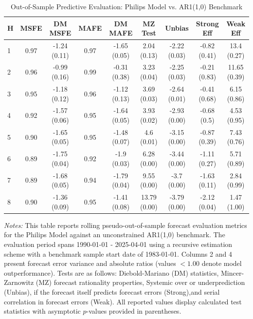 \begin{table}[htbp]
\centering
\caption{Out-of-Sample Predictive Evaluation: Philips Model vs. AR1(1,0) Benchmark}
\label{tab:philips_model_evaluation}
\footnotesize
\begin{tabular}{l cccccccc}
\hline\hline
\rule{0pt}{3ex}
\textbf{H} & \textbf{MSFE} & \textbf{DM MSFE} & \textbf{MAFE} & \textbf{DM MAFE} & \textbf{MZ Test} & \textbf{Unbias} & \textbf{Strong Eff} & \textbf{Weak Eff} \\[0.5ex]
\hline
\rule{0pt}{2.5ex}
1 & 0.97 & -1.24 (0.11) & 0.97 & -1.65 (0.05) & 2.04 (0.13) & -2.22 (0.03) & -0.82 (0.41) & 13.4 (0.27) \\
2 & 0.96 & -0.99 (0.16) & 0.99 & -0.31 (0.38) & 3.23 (0.04) & -2.25 (0.03) & -0.21 (0.83) & 11.65 (0.39) \\
3 & 0.95 & -1.18 (0.12) & 0.96 & -1.12 (0.13) & 3.69 (0.03) & -2.64 (0.01) & -0.41 (0.68) & 6.15 (0.86) \\
4 & 0.92 & -1.57 (0.06) & 0.95 & -1.64 (0.05) & 3.93 (0.02) & -2.93 (0.00) & -0.68 (0.5) & 4.53 (0.95) \\
5 & 0.90 & -1.65 (0.05) & 0.95 & -1.48 (0.07) & 4.6 (0.01) & -3.15 (0.00) & -0.87 (0.39) & 7.43 (0.76) \\
6 & 0.89 & -1.75 (0.04) & 0.92 & -1.9 (0.03) & 6.28 (0.00) & -3.44 (0.00) & -1.11 (0.27) & 5.71 (0.89) \\
7 & 0.89 & -1.68 (0.05) & 0.94 & -1.79 (0.04) & 9.55 (0.00) & -3.7 (0.00) & -1.63 (0.11) & 2.84 (0.99) \\
8 & 0.90 & -1.36 (0.09) & 0.95 & -1.41 (0.08) & 13.79 (0.00) & -3.79 (0.00) & -2.12 (0.04) & 1.47 (1.00) \\
\hline\hline
\end{tabular}%
\par\smallskip
\parbox{\textwidth}{\scriptsize \textit{Notes:} This table reports rolling pseudo-out-of-sample forecast evaluation metrics for the Philips Model against an unconstrained AR1(1,0) benchmark. The evaluation period spans 1990-01-01 - 2025-04-01 using a recursive estimation scheme with a benchmark sample start date of 1983-01-01. Columns 2 and 4 present forecast error variance and absolute ratios (values $< 1.00$ denote model outperformance). Tests are as follows: Diebold-Mariano (DM) statistics, Mincer-Zarnowitz (MZ) forecast rationality properties, Systemic over or underprediction (Unbias), if the forecast itself predicts forecast errors (Strong),and serial correlation in forecast errors (Weak). All reported values display calculated test statistics with asymptotic $p$-values provided in parentheses.}
\end{table}
